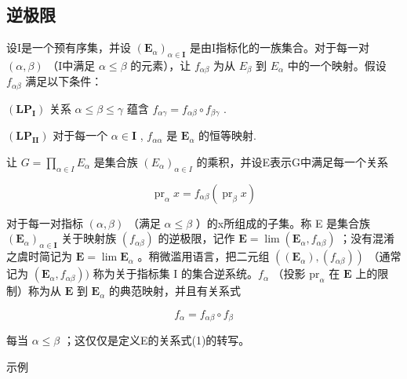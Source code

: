 \subsection{逆极限}

设I是一个预有序集，并设 \((\mathbf{E}_{\alpha})_{\alpha\in\mathbf{I}}\) 是由I指标化的一族集合。对于每一对 \((\alpha,\beta)\) （I中满足 \(\alpha\leqslant\beta\) 的元素），让 \(f_{\alpha\beta}\) 为从 \(E_{\beta}\) 到 \(E_{\alpha}\) 中的一个映射。假设 \(f_{\alpha\beta}\) 满足以下条件：

\((\mathbf{LP}_{\mathbf{I}})\) 关系 \(\alpha \leqslant \beta \leqslant \gamma\) 蕴含 \(f_{\alpha \gamma} = f_{\alpha \beta} \circ f_{\beta \gamma}\) .

\((\mathbf{LP}_{\mathbf{II}})\) 对于每一个 \(\alpha \in \mathbf{I}\) , \(f_{\alpha \alpha}\) 是 \(\mathbf{E}_{\alpha}\) 的恒等映射.

让 \(G = \prod_{\alpha \in I} E_{\alpha}\) 是集合族 \((E_{\alpha})_{\alpha \in I}\) 的乘积，并设E表示G中满足每一个关系

\[
\operatorname{pr} _ {\alpha} x = f _ {\alpha \beta} (\operatorname{pr} _ {\beta} x)\tag{1}
\]

对于每一对指标 \((\alpha, \beta)\) （满足 \(\alpha \leqslant \beta\) ）的x所组成的子集。称 E 是集合族 \((\mathbf{E}_{\alpha})_{\alpha \in \mathbf{I}}\) 关于映射族 \((f_{\alpha \beta})\) 的逆极限，记作 \(\mathbf{E} = \lim (\mathbf{E}_{\alpha}, f_{\alpha \beta})\) ；没有混淆之虞时简记为 \(\mathbf{E} = \lim \mathbf{E}_{\alpha}\) 。稍微滥用语言，把二元组 \(((\mathbf{E}_{\alpha}), (f_{\alpha \beta}))\) （通常记为 \((\mathbf{E}_{\alpha}, f_{\alpha \beta}))\) 称为关于指标集 I 的集合逆系统。\(f_{\alpha}\) （投影 \(\mathrm{pr}_{\alpha}\) 在 \(\mathbf{E}\) 上的限制）称为从 \(\mathbf{E}\) 到 \(\mathbf{E}_{\alpha}\) 的典范映射，并且有关系式

\[
f _ {\alpha} = f _ {\alpha \beta} \circ f _ {\beta}\tag{2}
\]

每当 \(\alpha \leqslant \beta\) ；这仅仅是定义E的关系式(1)的转写。

示例

